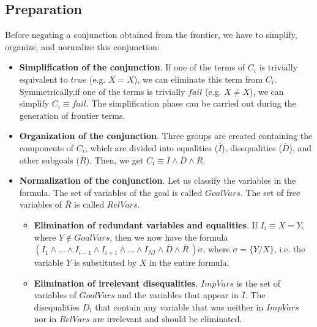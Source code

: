 \documentclass{llncs}
\begin{document}

\subsection{Preparation}
\label{preparation}


Before negating a conjunction obtained from the frontier, we have to
simplify, organize, and normalize this conjunction:

\begin{itemize}

\item {\bf Simplification of the conjunction}. If one of the terms of
$C_i$ is trivially equivalent to $true$ (e.g. $X=X$), we can eliminate
this term from $C_i$. Symmetrically,if one of the terms is trivially
$fail$ (e.g. $X \neq X$), we can simplify $C_i \equiv fail$. The
simplification phase can be carried out during the generation of
frontier terms.

\item {\bf Organization of the conjunction}. Three groups are created
containing the components of $C_i$, which are divided into equalities
($\overline{I}$), disequalities ($\overline{D}$), and other subgoals
($\overline{R}$).  Then, we get $C_i \equiv \overline{I} \wedge
\overline{D} \wedge \overline{R}$.
  
\item {\bf Normalization of the conjunction}. Let us classify the
variables in the formula. The set of variables of the
goal is called $GoalVars$. The set of free variables of $\overline{R}$
is called $RelVars$.

    \begin{itemize}


       \item {\bf Elimination of redundant variables and
       equalities}. If $I_i \equiv X = Y$, where $Y \not\in GoalVars$,
       then we now have the formula $ ( I_1 \wedge \ldots \wedge
       I_{i-1} \wedge I_{i+1} \wedge \ldots \wedge I_{NI} \wedge
       \overline{D} \wedge \overline{R}~) \sigma $, where $ \sigma = \{
       Y / X \}$, i.e. the variable $Y$ is substituted by $X$ in the
       entire formula. 
       \item {\bf Elimination of irrelevant disequalities}. $ImpVars$
       is the set of variables of $GoalVars$ and the variables that
       appear in $\overline{I}$. The disequalities $D_i$ that contain
       any variable that was neither in $ImpVars$ nor in $RelVars$ are
       irrelevant and should be eliminated.

    \end{itemize}

 \end{itemize}
\end{document}
